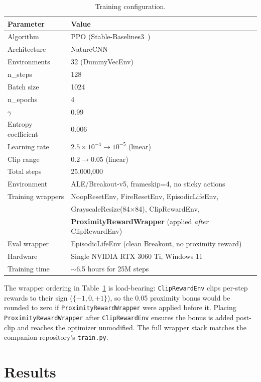 \documentclass[11pt]{article}
\begin{document}
\begin{table}[ht]
\centering
\begin{tabular}{ll}
\toprule
\textbf{Parameter} & \textbf{Value} \\
\midrule
Algorithm & PPO (Stable-Baselines3~\cite{raffin2021sb3}) \\
Architecture & NatureCNN \\
Environments & 32 (DummyVecEnv) \\
n\_steps & 128 \\
Batch size & 1024 \\
n\_epochs & 4 \\
$\gamma$ & 0.99 \\
Entropy coefficient & 0.006 \\
Learning rate & $2.5\times10^{-4} \rightarrow 10^{-5}$ (linear) \\
Clip range & $0.2 \rightarrow 0.05$ (linear) \\
Total steps & 25,000,000 \\
Environment & ALE/Breakout-v5, frameskip=4, no sticky actions \\
Training wrappers & NoopResetEnv, FireResetEnv, EpisodicLifeEnv, \\
& GrayscaleResize(84$\times$84), ClipRewardEnv, \\
& \textbf{ProximityRewardWrapper} (applied \emph{after} ClipRewardEnv) \\
Eval wrapper & EpisodicLifeEnv (clean Breakout, no proximity reward) \\
Hardware & Single NVIDIA RTX 3060 Ti, Windows 11 \\
Training time & $\sim$6.5 hours for 25M steps \\
\bottomrule
\end{tabular}
\caption{Training configuration.}
\label{tab:config}
\end{table}

The wrapper ordering in Table~\ref{tab:config} is load-bearing:
\texttt{ClipRewardEnv} clips per-step rewards to their sign ($\{-1, 0, +1\}$),
so the 0.05 proximity bonus would be rounded to zero if
\texttt{ProximityRewardWrapper} were applied before it. Placing
\texttt{ProximityRewardWrapper} after \texttt{ClipRewardEnv} ensures the bonus
is added post-clip and reaches the optimizer unmodified. The full wrapper stack
matches the companion repository's \texttt{train.py}.

\section{Results}
\end{document}
